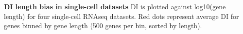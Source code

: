 \textbf{DI length bias in single-cell datasets} DI is plotted against log10(gene length) for four single-cell RNAseq datasets. Red dots represent average DI for genes binned by gene length (500 genes per bin, sorted by length).

